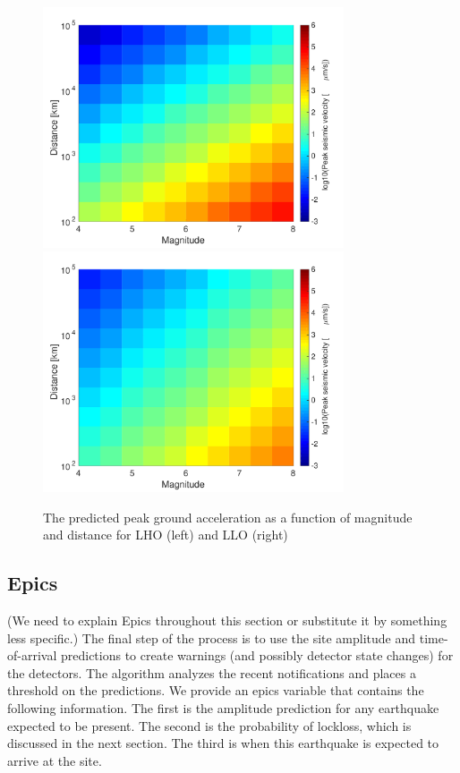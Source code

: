 \documentclass[reprint, prl, aps, showpacs]{revtex4-1}
\newcommand{\rednote}[1]{{\color{red} (#1)}}
\begin{document}
\begin{figure}[t]
\hspace*{-0.5cm}
 \includegraphics[width=3.5in]{LHO_M_r.pdf}
 \includegraphics[width=3.5in]{LLO_M_r.pdf}
 \caption{The predicted peak ground acceleration as a function of magnitude and distance for LHO (left) and LLO (right)}
 \label{fig:MvsR}
\end{figure}

\subsection{Epics}
\rednote{We need to explain Epics throughout this section or substitute it by something less specific.}
The final step of the process is to use the site amplitude and time-of-arrival predictions to create warnings (and possibly detector state changes) for the detectors. The algorithm analyzes the recent notifications and places a threshold on the predictions. We provide an epics variable that contains the following information. The first is the amplitude prediction for any earthquake expected to be present.
The second is the probability of lockloss, which is discussed in the next section. The third is when this earthquake is expected to arrive at the site.
		
\end{document}
